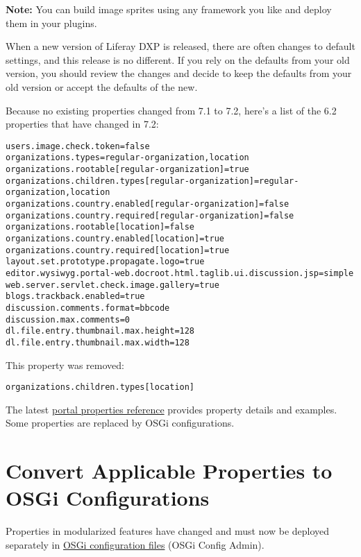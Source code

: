 \noindent\hrulefill

\textbf{Note:} You can build image sprites using any framework you like
and deploy them in your plugins.

\noindent\hrulefill

When a new version of Liferay DXP is released, there are often changes
to default settings, and this release is no different. If you rely on
the defaults from your old version, you should review the changes and
decide to keep the defaults from your old version or accept the defaults
of the new.

Because no existing properties changed from 7.1 to 7.2, here's a list of
the 6.2 properties that have changed in 7.2:

\begin{verbatim}
users.image.check.token=false
organizations.types=regular-organization,location
organizations.rootable[regular-organization]=true
organizations.children.types[regular-organization]=regular-organization,location
organizations.country.enabled[regular-organization]=false
organizations.country.required[regular-organization]=false
organizations.rootable[location]=false
organizations.country.enabled[location]=true
organizations.country.required[location]=true
layout.set.prototype.propagate.logo=true
editor.wysiwyg.portal-web.docroot.html.taglib.ui.discussion.jsp=simple
web.server.servlet.check.image.gallery=true
blogs.trackback.enabled=true
discussion.comments.format=bbcode
discussion.max.comments=0
dl.file.entry.thumbnail.max.height=128
dl.file.entry.thumbnail.max.width=128
\end{verbatim}

This property was removed:

\begin{verbatim}
organizations.children.types[location]
\end{verbatim}

The latest
\href{@platform-ref@/7.2-latest/propertiesdoc/portal.properties.html}{portal
properties reference} provides property details and examples. Some
properties are replaced by OSGi configurations.

\section{Convert Applicable Properties to OSGi
Configurations}\label{convert-applicable-properties-to-osgi-configurations}

Properties in modularized features have changed and must now be deployed
separately in
\href{/docs/7-2/user/-/knowledge_base/u/system-settings\#exporting-and-importing-configurations}{OSGi
configuration files} (OSGi Config Admin).

